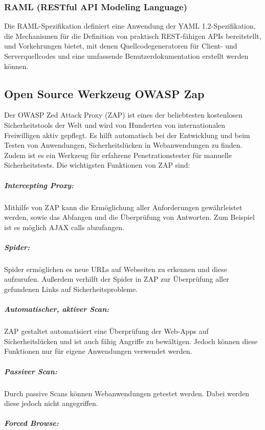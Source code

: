 \subsubsection{RAML (RESTful API Modeling Language)}

Die RAML-Spezifikation definiert eine Anwendung der YAML 1.2-Spezifikation, die Mechanismen für die Definition von praktisch REST-fähigen APIs bereitstellt, und Vorkehrungen bietet, mit denen Quellcodegeneratoren für Client- und Serverquellcodes und eine umfassende Benutzerdokumentation erstellt werden können\cite{ramldefinition16}.

\subsection{Open Source Werkzeug OWASP Zap}
\label{owaspzap-def}

Der OWASP Zed Attack Proxy (ZAP) ist eines der beliebtesten kostenlosen Sicherheitstools der Welt und wird von Hunderten von internationalen Freiwilligen aktiv gepflegt. Es hilft automatisch bei der Entwicklung und beim Testen von Anwendungen, Sicherheitslücken in Webanwendungen zu finden. Zudem ist es ein Werkzeug für erfahrene Penetrationstester für manuelle Sicherheitstests\cite{owasp18def}. Die wichtigsten Funktionen von ZAP sind\cite{owaspfunktionen18}:

\subparagraph{Intercepting Proxy:}

Mithilfe von ZAP kann die Ermöglichung aller Anforderungen gewährleistet werden, sowie das Abfangen und die Überprüfung von Antworten. Zum Beispiel ist es möglich AJAX calls abzufangen.

\subparagraph{Spider:}

Spider ermöglichen es neue URLs auf Webseiten zu erkennen und diese aufzurufen. Außerdem verhilft der Spider in ZAP zur Überprüfung aller gefundenen Links auf Sicherheitsprobleme. 

\subparagraph{Automatischer, aktiver Scan:}

ZAP gestaltet automatisiert eine Überprüfung der Web-Apps auf Sicherheitslücken und ist auch fähig Angriffe zu bewältigen. Jedoch können diese Funktionen nur für eigene Anwendungen verwendet werden. 

\subparagraph{Passiver Scan:}

Durch passive Scans können Webanwendungen getestet werden. Dabei werden diese jedoch nicht angegriffen. 

\subparagraph{Forced Browse:}

